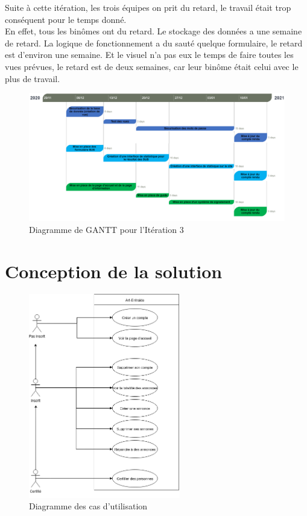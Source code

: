 \documentclass[a4paper,11pt]{article}
\begin{document}
Suite à cette itération, les trois équipes on prit du retard, le travail était trop conséquent pour le temps donné.\\
En effet, tous les binômes ont du retard. Le stockage des données a une semaine de retard.
La logique de fonctionnement a du sauté quelque formulaire, le retard est d'environ une semaine.
Et le visuel n'a pas eux le temps de faire toutes les vues prévues, le retard est de deux semaines, car leur binôme était celui avec le plus de travail.

\begin{figure}[H]
  \includegraphics[width=\linewidth]{images/gantt-iteration3.png}
  \caption{Diagramme de GANTT pour l'Itération 3}
  \label{fig:gantt-iteration3}
\end{figure}

\section{Conception de la solution}

\begin{figure}[H]
  \includegraphics[width=250px]{../Conception/DCU.png}
  \caption{Diagramme des cas d'utilisation}
  \label{fig:DCU}
\end{figure}
\end{document}
